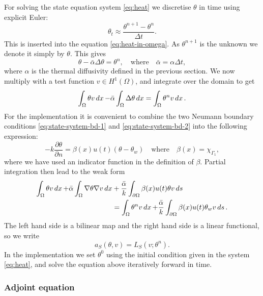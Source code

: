 For solving the state equation system \eqref{eq:heat} we discretise $\theta$ in time using explicit Euler:
\begin{equation*}
    \theta_t \approx \frac{\theta^{n+1} - \theta^n}{\Delta t}.
\end{equation*}
This is inserted into the equation \eqref{eq:heat-in-omega}. As $\theta^{n+1}$ is the unknown we denote it simply by $\theta$. This gives
\begin{equation*}
    \theta - \bar{\alpha}\Delta \theta = \theta^n, \quad\textrm{where}\quad \bar{\alpha} = \alpha\Delta t,
\end{equation*}
where $\alpha$ is the thermal diffusivity defined in the previous section. We now multiply with a test function $v\in H^1(\Omega)$, and integrate over the domain to get
\begin{equation*}
    \int_\Omega \theta v \mathop{dx} - \bar{\alpha}\int_\Omega \Delta\theta\mathop{dx} = \int_\Omega \theta^n v\mathop{dx}.
\end{equation*}
For the implementation it is convenient to combine the two Neumann boundary conditions \eqref{eq:state-system-bd-1} and \eqref{eq:state-system-bd-2} into the following expression:
\begin{equation*}
    -k\frac{\partial \theta}{\partial n} = \beta(x)u(t)(\theta - \theta_w) \quad\text{where}\quad \beta(x) = \chi_{\Gamma_1},
\end{equation*}
where we have used an indicator function in the definition of $\beta$.
Partial integration then lead to the weak form
\begin{equation*}
\begin{aligned}
    \int_\Omega \theta v\mathop{dx} + \bar{\alpha}\int_\Omega\nabla\theta\nabla v\mathop{dx} &+ \frac{\bar{\alpha}}{k}\int_{\partial\Omega}\beta(x)u(t)\theta v\mathop{ds} \\
    &= \int_\Omega\theta^n v\mathop{dx} + \frac{\bar{\alpha}}{k}\int_{\partial\Omega}\beta(x)u(t)\theta_w v\mathop{ds}.
\end{aligned}
\end{equation*}
The left hand side is a bilinear map and the right hand side is a linear functional, so we write
\begin{equation*}
    a_S(\theta, v) = L_S(v; \theta^n).
\end{equation*}
In the implementation we set $\theta^0$ using the initial condition given in the system \eqref{eq:heat}, and solve the equation above iteratively forward in time.

\subsubsection{Adjoint equation}

